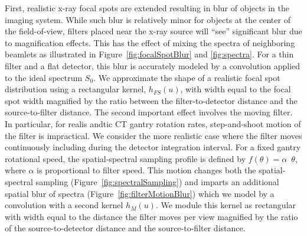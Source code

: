 \documentclass[]{spie}  %
\begin{document}
First, realistic x-ray focal spots are extended resulting in blur of objects in the imaging system. While such blur is relatively minor for objects at the center of the field-of-view, filters placed near the x-ray source will ``see'' significant blur due to magnification effects. This has the effect of mixing the spectra of neighboring beamlets as illustrated in Figure~\ref{fig:focalSpotBlur} and \ref{fig:spectra}. For a thin filter and a flat detector, this blur is accurately modeled by a convolution applied to the ideal spectrum $S_0$. We approximate the shape of a realistic focal spot distribution using a rectangular kernel, $h_{FS}(u)$, with width equal to the focal spot width magnified by the ratio between the filter-to-detector distance and the source-to-filter distance.
The second important effect involves the moving filter. In particular, for realis andtic CT gantry rotation rates, step-and-shoot motion of the filter is impractical. We consider the more realistic case where the filter moves continuously including during the detector integration interval. For a fixed gantry rotational speed, the spatial-spectral sampling profile is defined by $f(\theta) = \alpha \enspace\theta$, where $\alpha$ is proportional to filter speed. This motion changes both the spatial-spectral sampling (Figure~\ref{fig:spectralSampling}) and imparts an additional spatial blur of spectra (Figure~\ref{fig:filterMotionBlur}) which we model by a convolution with a second kernel $h_M(u)$. We module this kernel as rectangular with width equal to the distance the filter moves per view magnified by the ratio of the source-to-detector distance and the source-to-filter distance. 

\end{document}
